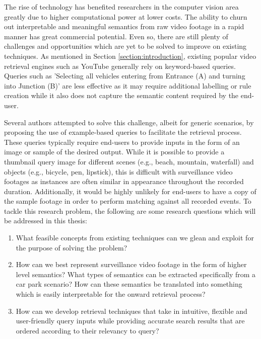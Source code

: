
The rise of technology has benefited researchers in the computer vision area greatly due to higher computational power at lower costs. The ability to churn out interpretable and meaningful semantics from raw video footage in a rapid manner has great commercial potential. Even so, there are still plenty of challenges and opportunities which are yet to be solved to improve on existing techniques. As mentioned in Section \ref{section:introduction}, existing popular video retrieval engines such as YouTube generally rely on keyword-based queries. Queries such as 'Selecting all vehicles entering from Entrance (A) and turning into Junction (B)' are less effective as it may require additional labelling or rule creation while it also does not capture the semantic content required by the end-user.

Several authors attempted to solve this challenge,
albeit for generic scenarios,
by proposing the use of example-based queries \cite{zhang2017car, liu2016large, castanon2016retrieval} to facilitate the retrieval process.
These queries typically require end-users to provide inputs in the form of an image or sample of the desired output. While it is possible to provide a thumbnail query image for different scenes (e.g., beach, mountain, waterfall) and objects (e.g., bicycle, pen, lipstick), this is difficult with surveillance video footages as instances are often similar in appearance throughout the recorded duration. Additionally, it would be highly unlikely for end-users to have a copy of the sample footage in order to perform matching against all recorded events.
To tackle this research problem, the following are some research questions which will be addressed in this thesis:
\begin{enumerate}
\item What feasible concepts from existing techniques can we glean and exploit for the purpose of solving the problem?
\item How can we best represent surveillance video footage in the form of higher level semantics? What types of semantics can be extracted specifically from a car park scenario? How can these semantics be translated into something which is easily interpretable for the onward retrieval process?
\item How can we develop retrieval techniques that take in intuitive, flexible and user-friendly query inputs while providing accurate search results that are ordered according to their relevancy to query?
\end{enumerate}


